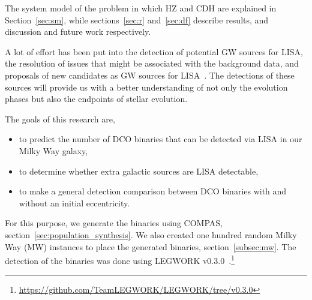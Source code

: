 \documentclass[12pt, journal, onecolumn]{IEEEtran}
\begin{document}
    The system model of the problem in which HZ and CDH are explained in Section~\ref{sec:sm}, while sections~\ref{sec:r} and~\ref{sec:df} describe results, and discussion and future work respectively.




    A lot of effort has been put into the detection of potential GW sources for LISA, the resolution of issues that
    might be associated with the background data, and proposals of new candidates as GW sources for LISA~\cite[see,
        for example,][]{Lau2020, Sesana2009, Khakhaleva2020, Renzo2021, Fumagalli2022, wagg2021gravitational,
        Broekgaarden2021, Shao2021, Andrews2020, Belczynski2010, Guo2017, Babak2010, Blaut2010, Babak2008, Ruiter2010, Nelemans2001, Yu2010}.
    The detections of these sources will provide us with a better understanding of not only the evolution phases but also the endpoints of stellar evolution.

    The goals of this research are,
    \begin{itemize}%
        \item to predict the number of DCO binaries that can be detected via LISA in our Milky Way galaxy,
        \item to determine whether extra galactic sources are LISA detectable,
        \item to make a general detection comparison between DCO binaries with and without an initial eccentricity.
    \end{itemize}%

    For this purpose, we generate the binaries using COMPAS, section~\ref{sec:population_synthesis}.
    We also created one hundred random Milky Way (MW) instances to place the generated binaries, section~\ref{subsec:mw}.
    The detection of the binaries was done using LEGWORK v0.3.0~\cite{wagg2021legwork}.\footnote{\url{https://github.com/TeamLEGWORK/LEGWORK/tree/v0.3.0}}
\end{document}
